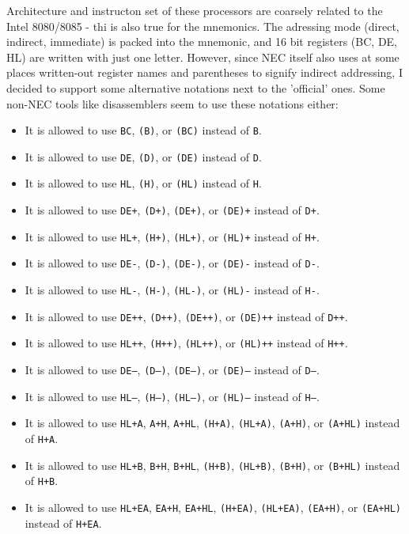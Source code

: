 \documentclass[12pt,twoside]{report}
\newcommand{\tty}[1]{{\tt #1}}
\begin{document}
Architecture and instructon set of these processors are coarsely
related to the Intel 8080/8085 - thi is also true for the
mnemonics.  The adressing mode (direct, indirect, immediate) is
packed into the mnemonic, and 16 bit registers (BC, DE, HL) are
written with just one letter.  However, since NEC itself also
uses at some places written-out register names and parentheses to
signify indirect addressing, I decided to support some
alternative notations next to the 'official' ones.   Some non-NEC
tools like disassemblers seem to use these notations either:

\begin{itemize}
\item{It is allowed to use \tty{BC}, \tty{(B)}, or \tty{(BC)}
      instead of \tty{B}.}
\item{It is allowed to use \tty{DE}, \tty{(D)}, or \tty{(DE)}
      instead of \tty{D}.}
\item{It is allowed to use \tty{HL}, \tty{(H)}, or \tty{(HL)}
      instead of \tty{H}.}
\item{It is allowed to use \tty{DE+}, \tty{(D+)}, \tty{(DE+)},
      or \tty{(DE)+} instead of \tty{D+}.}
\item{It is allowed to use \tty{HL+}, \tty{(H+)}, \tty{(HL+)},
      or \tty{(HL)+} instead of \tty{H+}.}
\item{It is allowed to use \tty{DE-}, \tty{(D-)}, \tty{(DE-)},
      or \tty{(DE)-} instead of \tty{D-}.}
\item{It is allowed to use \tty{HL-}, \tty{(H-)}, \tty{(HL-)},
      or \tty{(HL)-} instead of \tty{H-}.}
\item{It is allowed to use \tty{DE++}, \tty{(D++)}, \tty{(DE++)},
      or \tty{(DE)++} instead of \tty{D++}.}
\item{It is allowed to use \tty{HL++}, \tty{(H++)}, \tty{(HL++)},
      or \tty{(HL)++} instead of \tty{H++}.}
\item{It is allowed to use \tty{DE--}, \tty{(D--)}, \tty{(DE--)},
      or \tty{(DE)--} instead of \tty{D--}.}
\item{It is allowed to use \tty{HL--}, \tty{(H--)}, \tty{(HL--)},
      or \tty{(HL)--} instead of \tty{H--}.}
\item{It is allowed to use \tty{HL+A}, \tty{A+H}, \tty{A+HL},
      \tty{(H+A)}, \tty{(HL+A)}, \tty{(A+H)}, or \tty{(A+HL)}
      instead of \tty{H+A}.}
\item{It is allowed to use \tty{HL+B}, \tty{B+H}, \tty{B+HL},
      \tty{(H+B)}, \tty{(HL+B)}, \tty{(B+H)}, or \tty{(B+HL)}
      instead of \tty{H+B}.}
\item{It is allowed to use \tty{HL+EA}, \tty{EA+H}, \tty{EA+HL},
      \tty{(H+EA)}, \tty{(HL+EA)}, \tty{(EA+H)}, or \tty{(EA+HL)}
      instead of \tty{H+EA}.}
\end{itemize}
\end{document}
